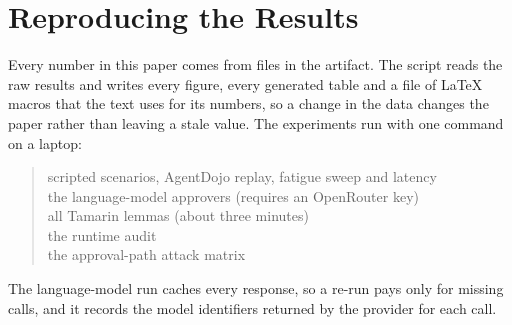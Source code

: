 \section{Reproducing the Results}\label{app:repro}

Every number in this paper comes from files in the artifact. The script  reads the
raw results and writes every figure, every generated table and a file of \LaTeX{} macros that the text uses for its
numbers, so a change in the data changes the paper rather than leaving a stale value. The experiments run with one
command on a laptop:
\begin{quote}\small
{}\hfill scripted scenarios, AgentDojo replay, fatigue sweep and latency\\
\hfill the language-model approvers (requires an OpenRouter key)\\
\hfill all Tamarin lemmas (about three minutes)\\
\hfill the runtime audit\\
\hfill the approval-path attack matrix
\end{quote}
The language-model run caches every response, so a re-run pays only for missing calls, and it records the model
identifiers returned by the provider for each call.
